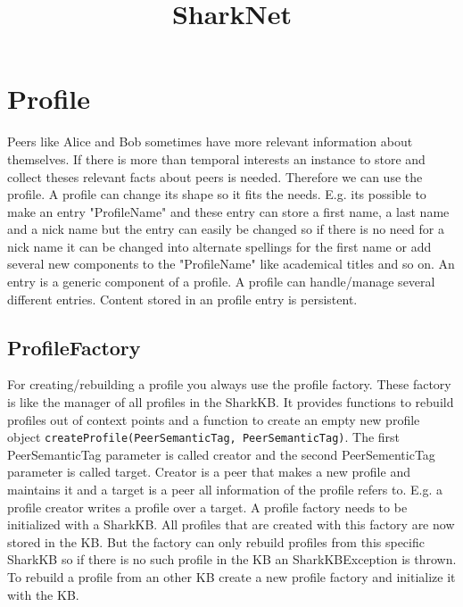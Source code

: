 \documentclass[12pt]{article}
\begin{document}
\title{SharkNet}
\maketitle

\section{Profile}
\label{sec:knowledgePorts:Profile}
Peers like Alice and Bob sometimes have more relevant information about themselves. If there is more than temporal interests an instance to store and collect theses relevant facts about peers is needed. Therefore we can use the profile. A profile can change its shape so it fits the needs. E.g. its possible to make an entry "ProfileName" and these entry can store a first name, a last name and a nick name but the entry can easily be changed so if there is no need for a nick name it can be changed into alternate spellings for the first name or add several new components to the "ProfileName" like academical titles and so on. 
An entry is a generic component of a profile. A profile can handle/manage several different entries. Content stored in an profile entry is persistent. 

\subsection{ProfileFactory}
For creating/rebuilding a profile you always use the profile factory. These factory is like the manager of all profiles in the SharkKB. It provides functions to rebuild profiles out of context points and a function to create an empty new profile object {\tt createProfile(PeerSemanticTag, PeerSemanticTag)}. The first PeerSemanticTag parameter is called creator and the second PeerSementicTag parameter is called target. Creator is a peer that makes a new profile and maintains it and a target is a peer all information of the profile refers to. E.g. a profile creator writes a profile over a target. A profile factory needs to be initialized with a SharkKB. All profiles that are created with this factory are now stored in the KB. But the factory can only rebuild profiles from this specific SharkKB so if there is no such profile in the KB an SharkKBException is thrown. To rebuild a profile from an other KB create a new profile factory and initialize it with the KB.
\end{document}
